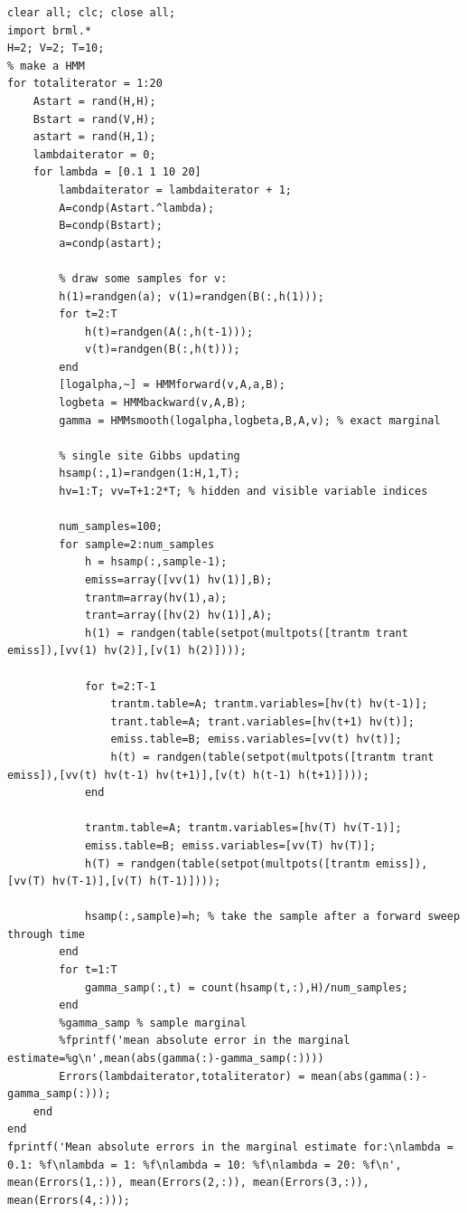 \documentclass[11pt,a4paper,oneside]{report}
\begin{document}
\begin{lstlisting}
clear all; clc; close all;
import brml.*
H=2; V=2; T=10;
% make a HMM
for totaliterator = 1:20
    Astart = rand(H,H);
    Bstart = rand(V,H);
    astart = rand(H,1);
    lambdaiterator = 0;
    for lambda = [0.1 1 10 20]
        lambdaiterator = lambdaiterator + 1;
        A=condp(Astart.^lambda);
        B=condp(Bstart);
        a=condp(astart);

        % draw some samples for v:
        h(1)=randgen(a); v(1)=randgen(B(:,h(1)));
        for t=2:T
            h(t)=randgen(A(:,h(t-1)));  
            v(t)=randgen(B(:,h(t)));
        end
        [logalpha,~] = HMMforward(v,A,a,B); 
        logbeta = HMMbackward(v,A,B);
        gamma = HMMsmooth(logalpha,logbeta,B,A,v); % exact marginal

        % single site Gibbs updating
        hsamp(:,1)=randgen(1:H,1,T);
        hv=1:T; vv=T+1:2*T; % hidden and visible variable indices

        num_samples=100;
        for sample=2:num_samples
            h = hsamp(:,sample-1);
            emiss=array([vv(1) hv(1)],B);
            trantm=array(hv(1),a);
            trant=array([hv(2) hv(1)],A);
            h(1) = randgen(table(setpot(multpots([trantm trant emiss]),[vv(1) hv(2)],[v(1) h(2)])));

            for t=2:T-1
                trantm.table=A; trantm.variables=[hv(t) hv(t-1)];
                trant.table=A; trant.variables=[hv(t+1) hv(t)];
                emiss.table=B; emiss.variables=[vv(t) hv(t)];
                h(t) = randgen(table(setpot(multpots([trantm trant emiss]),[vv(t) hv(t-1) hv(t+1)],[v(t) h(t-1) h(t+1)])));
            end

            trantm.table=A; trantm.variables=[hv(T) hv(T-1)];
            emiss.table=B; emiss.variables=[vv(T) hv(T)];
            h(T) = randgen(table(setpot(multpots([trantm emiss]),[vv(T) hv(T-1)],[v(T) h(T-1)])));

            hsamp(:,sample)=h; % take the sample after a forward sweep through time
        end
        for t=1:T
            gamma_samp(:,t) = count(hsamp(t,:),H)/num_samples;
        end
        %gamma_samp % sample marginal
        %fprintf('mean absolute error in the marginal estimate=%g\n',mean(abs(gamma(:)-gamma_samp(:))))
        Errors(lambdaiterator,totaliterator) = mean(abs(gamma(:)-gamma_samp(:)));
    end
end
fprintf('Mean absolute errors in the marginal estimate for:\nlambda = 0.1: %f\nlambda = 1: %f\nlambda = 10: %f\nlambda = 20: %f\n', mean(Errors(1,:)), mean(Errors(2,:)), mean(Errors(3,:)), mean(Errors(4,:)));
\end{lstlisting}
\end{document}
